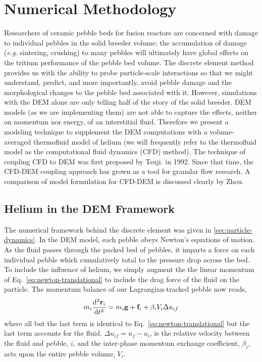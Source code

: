 \section{Numerical Methodology}
Researchers of ceramic pebble beds for fusion reactors are concerned with damage to individual pebbles in the solid breeder volume; the accumulation of damage (\textit{e.g.} sintering, crushing) to many pebbles will ultimately have global effects on the tritium performance of the pebble bed volume.  The discrete element method provides us with the ability to probe particle-scale interactions so that we might understand, predict, and more importantly, avoid pebble damage and the morphological changes to the pebble bed associated with it. However, simulations with the DEM alone are only telling half of the story of the solid breeder. DEM models (as we are implementing them) are not able to capture the effects, neither on momentum nor energy, of an interstitial fluid. Therefore we present a modeling technique to supplement the DEM computations with a volume-averaged thermofluid model of helium (we will frequently refer to the thermofluid model as the computational fluid dynamics (CFD) method). The technique of coupling CFD to DEM was first proposed by Tsuji\etal.\cite{Tsuji1992} in 1992. Since that time, the CFD-DEM coupling approach has grown as a tool for granular flow research. A comparison of model formulation for CFD-DEM is discussed clearly by Zhou\etal\cite{Zhou2010}.

\subsection{Helium in the DEM Framework}\label{sec:cfdem-heat-transfer}

The numerical framework behind the discrete element was given in \cref{sec:particle-dynamics}. In the DEM model, each pebble obeys Newton's equations of motion. As the fluid passes through the packed bed of pebbles, it imparts a force on each individual pebble which cumulatively total to the pressure drop across the bed. To include the influence of helium, we simply augment the the linear momentum of Eq.~\ref{eq:newton-translational} to include the drag force of the fluid on the particle. The momentum balance of our Lagrangian-tracked pebble now reads,
\begin{equation}\label{eq:cfdem-dem-momentum}
	m_i  \frac{\mathrm{d}^2{\mathbf{r}_i}}{\mathrm{d}t^2} = m_i\mathbf{g} + \mathbf{f}_i + \beta_i V_i \Delta u_{if}
\end{equation}
where all but the last term is identical to Eq.~\ref{eq:newton-translational} but the last term accounts for the fluid. $\Delta u_{if} = u_f - u_i$, is the relative velocity between the fluid and pebble, $i$, and the inter-phase momentum exchange coefficient, $\beta_i$, acts upon the entire pebble volume, $V_i$. 

